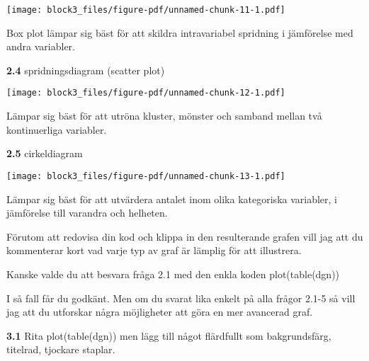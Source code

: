 \documentclass[
  letterpaper,
  DIV=11,
  numbers=noendperiod]{scrartcl}
\newenvironment{Shaded}{\begin{snugshade}}{\end{snugshade}}
\newcommand{\AttributeTok}[1]{\textcolor[rgb]{0.40,0.45,0.13}{#1}}
\newcommand{\CommentTok}[1]{\textcolor[rgb]{0.37,0.37,0.37}{#1}}
\newcommand{\FunctionTok}[1]{\textcolor[rgb]{0.28,0.35,0.67}{#1}}
\newcommand{\NormalTok}[1]{\textcolor[rgb]{0.00,0.23,0.31}{#1}}
\newcommand{\OtherTok}[1]{\textcolor[rgb]{0.00,0.23,0.31}{#1}}
\newcommand{\SpecialCharTok}[1]{\textcolor[rgb]{0.37,0.37,0.37}{#1}}
\newcommand{\StringTok}[1]{\textcolor[rgb]{0.13,0.47,0.30}{#1}}
\begin{document}
\texttt{[image: block3\_files/figure-pdf/unnamed-chunk-11-1.pdf]}

Box plot lämpar sig bäst för att skildra intravariabel spridning i
jämförelse med andra variabler.

\textbf{2.4} spridningsdiagram (scatter plot)

\begin{Shaded}
\end{Shaded}

\texttt{[image: block3\_files/figure-pdf/unnamed-chunk-12-1.pdf]}

Lämpar sig bäst för att utröna kluster, mönster och samband mellan två
kontinuerliga variabler.

\textbf{2.5} cirkeldiagram

\begin{Shaded}
\end{Shaded}

\texttt{[image: block3\_files/figure-pdf/unnamed-chunk-13-1.pdf]}

Lämpar sig bäst för att utvärdera antalet inom olika kategoriska
variabler, i jämförelse till varandra och helheten.

Förutom att redovisa din kod och klippa in den resulterande grafen vill
jag att du kommenterar kort vad varje typ av graf är lämplig för att
illustrera.

Kanske valde du att besvara fråga 2.1 med den enkla koden
plot(table(dgn))

I så fall får du godkänt. Men om du svarat lika enkelt på alla frågor
2.1-5 så vill jag att du utforskar några möjligheter att göra en mer
avancerad graf.

\textbf{3.1} Rita plot(table(dgn)) men lägg till något flärdfullt som
bakgrundsfärg, titelrad, tjockare staplar.

\begin{Shaded}
\end{Shaded}
\end{document}
